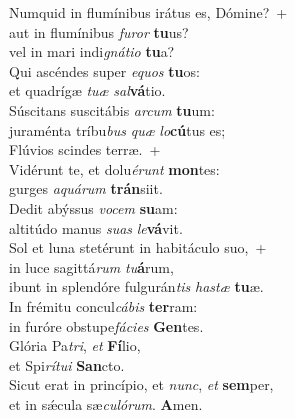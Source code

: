 \evenverse Numquid in flumínibus irátus es, Dómine?~+\\\evenverse  aut in flumínibus \textit{fu}\textit{ror} \textbf{tu}us?~\*\\
\evenverse vel in mari indi\textit{gná}\textit{ti}\textit{o} \textbf{tu}a?\\
\oddverse Qui ascéndes super \textit{e}\textit{quos} \textbf{tu}os:~\*\\
\oddverse et quadrígæ \textit{tu}\textit{æ} \textit{sal}\textbf{vá}tio.\\
\evenverse Súscitans suscitábis \textit{ar}\textit{cum} \textbf{tu}um:~\*\\
\evenverse juraménta tríbu\textit{bus} \textit{quæ} \textit{lo}\textbf{cú}tus es;\\
\oddverse Flúvios scindes terræ.~+\\
\oddverse  Vidérunt te, et dolu\textit{é}\textit{runt} \textbf{mon}tes:~\*\\
\oddverse gurges \textit{a}\textit{quá}\textit{rum} \textbf{trán}siit.\\
\evenverse Dedit abýssus \textit{vo}\textit{cem} \textbf{su}am:~\*\\
\evenverse altitúdo manus \textit{su}\textit{as} \textit{le}\textbf{vá}vit.\\
\oddverse Sol et luna stetérunt in habitáculo suo,~+\\
\oddverse  in luce sagittá\textit{rum} \textit{tu}\textbf{á}rum,~\*\\
\oddverse ibunt in splendóre fulgurán\textit{tis} \textit{ha}\textit{stæ} \textbf{tu}æ.\\
\evenverse In frémitu concul\textit{cá}\textit{bis} \textbf{ter}ram:~\*\\
\evenverse in furóre obstupe\textit{fá}\textit{ci}\textit{es} \textbf{Gen}tes.\\
\oddverse Glória Pa\textit{tri}, \textit{et} \textbf{Fí}lio,~\*\\
\oddverse et Spi\textit{rí}\textit{tu}\textit{i} \textbf{San}cto.\\
\evenverse Sicut erat in princípio, et \textit{nunc}, \textit{et} \textbf{sem}per,~\*\\
\evenverse et in sǽcula sæ\textit{cu}\textit{ló}\textit{rum}. \textbf{A}men.\\
